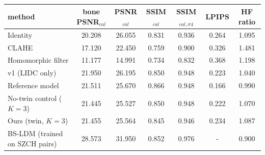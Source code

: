 \begin{tabular}{lcccccc}
\toprule
method & bone PSNR$_{cal}$ & PSNR$_{cal}$ & SSIM$_{cal}$ & SSIM$_{cal,\sigma4}$ & LPIPS & HF ratio \\
\midrule
Identity & 20.208 & 26.055 & 0.831 & 0.936 & 0.264 & 1.095 \\
CLAHE & 17.120 & 22.450 & 0.759 & 0.900 & 0.326 & 1.481 \\
Homomorphic filter & 11.177 & 14.991 & 0.734 & 0.832 & 0.368 & 1.198 \\
v1 (LIDC only) & 21.950 & 26.195 & 0.850 & 0.948 & 0.223 & 1.040 \\
Reference model & 21.511 & 25.670 & 0.866 & 0.948 & 0.166 & 0.990 \\
No-twin control ($K=3$) & 21.445 & 25.527 & 0.850 & 0.948 & 0.222 & 1.070 \\
Ours (twin, $K=3$) & 21.455 & 25.564 & 0.845 & 0.946 & 0.234 & 1.087 \\
BS-LDM (trained on SZCH pairs) & 28.573 & 31.950 & 0.852 & 0.976 & - & 0.900 \\
\bottomrule
\end{tabular}
